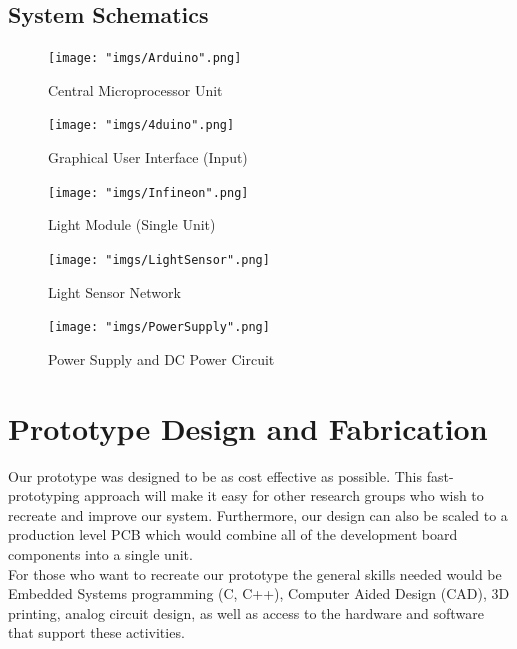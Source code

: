\documentclass[12pt,a4paper]{report}
\begin{document}
\subsection{System Schematics}
\begin{figure}[H]
	\centering
	\texttt{[image: "imgs/Arduino".png]}\par			\vspace{0.1cm}
	\caption{Central Microprocessor Unit}
\end{figure}
\newpage
\begin{figure}[H]
	\centering
	\texttt{[image: "imgs/4duino".png]}\par			\vspace{0.1cm}
	\caption{Graphical User Interface (Input)}
\end{figure}
\newpage
\begin{figure}[H]
	\centering
	\texttt{[image: "imgs/Infineon".png]}\par			\vspace{0.1cm}
	\caption{Light Module (Single Unit)}
\end{figure}
\newpage
\begin{figure}[H]
	\centering
	\texttt{[image: "imgs/LightSensor".png]}\par			\vspace{0.1cm}
	\caption{Light Sensor Network}
\end{figure}
\newpage
\begin{figure}[H]
	\centering
	\texttt{[image: "imgs/PowerSupply".png]}\par			\vspace{0.1cm}
	\caption{Power Supply and DC Power Circuit}
\end{figure}
\newpage











\section{Prototype Design and Fabrication}
Our prototype was designed to be as cost effective as possible. This fast-prototyping approach will make it easy for other research groups who wish to recreate and improve our system. Furthermore, our design can also be scaled to a production level PCB which would combine all of the development board components into a single unit. \\
\linebreak
For those who want to recreate our prototype the general skills needed would be Embedded Systems programming (C, C++), Computer Aided Design (CAD), 3D printing, analog circuit design, as well as access to the hardware and software that support these activities. 
\end{document}
